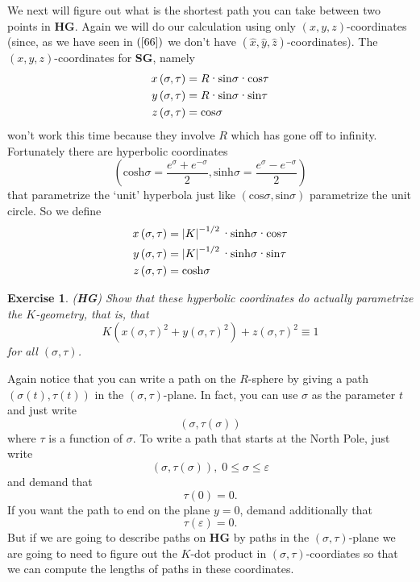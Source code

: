 \documentclass{article}%
\newtheorem{exercise}[theorem]{Exercise}
\begin{document}
We next will figure out what is the shortest path you can take between two
points in \textbf{HG}. Again we will do our calculation using only $\left(
x,y,z\right)  $-coordinates (since, as we have seen in $\left(  \ref{66}%
\right)  $ we don't have $\left(  \hat{x},\hat{y},\hat{z}\right)
$-coordinates). The $\left(  x,y,z\right)  $-coordinates for \textbf{SG},
namely
\begin{align*}
x\left(  \sigma,\tau\right)   &  =R\text{\textperiodcentered}\mathrm{sin}%
\sigma\text{\textperiodcentered}\mathrm{cos}\tau\\
y\left(  \sigma,\tau\right)   &  =R\text{\textperiodcentered}\mathrm{sin}%
\sigma\text{\textperiodcentered}\mathrm{sin}\tau\\
z\left(  \sigma,\tau\right)   &  =\mathrm{cos}\sigma
\end{align*}
won't work this time because they involve $R$ which has gone off to infinity.
Fortunately there are hyperbolic coordinates%
\[
\left(  \mathrm{cosh}\sigma=\frac{e^{\sigma}+e^{-\sigma}}{2},\mathrm{sinh}%
\sigma=\frac{e^{\sigma}-e^{-\sigma}}{2}\right)
\]
that parametrize the `unit' hyperbola just like $\left(  \mathrm{cos}%
\sigma,\mathrm{sin}\sigma\right)  $ parametrize the unit circle. So we define%
\begin{align*}
x\left(  \sigma,\tau\right)   &  =\left\vert K\right\vert ^{-1/2}%
\text{\textperiodcentered}\mathrm{sinh}\sigma\text{\textperiodcentered
}\mathrm{cos}\tau\\
y\left(  \sigma,\tau\right)   &  =\left\vert K\right\vert ^{-1/2}%
\text{\textperiodcentered}\mathrm{sinh}\sigma\text{\textperiodcentered
}\mathrm{sin}\tau\\
z\left(  \sigma,\tau\right)   &  =\mathrm{cosh}\sigma
\end{align*}


\begin{exercise}
(\textbf{HG}) Show that these hyperbolic coordinates do actually parametrize
the $K$-geometry, that is, that%
\[
K\left(  x\left(  \sigma,\tau\right)  ^{2}+y\left(  \sigma,\tau\right)
^{2}\right)  +z\left(  \sigma,\tau\right)  ^{2}\equiv1
\]
for all $\left(  \sigma,\tau\right)  $.
\end{exercise}

Again notice that you can write a path on the $R$-sphere by giving a path
$\left(  \sigma\left(  t\right)  ,\tau\left(  t\right)  \right)  $ in the
$\left(  \sigma,\tau\right)  $-plane. In fact, you can use $\sigma$ as the
parameter $t$ and just write
\[
\left(  \sigma,\tau\left(  \sigma\right)  \right)
\]
where $\tau$ is a function of $\sigma$. To write a path that starts at the
North Pole, just write%
\[
\left(  \sigma,\tau\left(  \sigma\right)  \right)  ,\;0\leq\sigma
\leq\varepsilon
\]
and demand that%
\[
\tau\left(  0\right)  =0.
\]
If you want the path to end on the plane $y=0$, demand additionally that%
\[
\tau\left(  \varepsilon\right)  =0.
\]
But if we are going to describe paths on \textbf{HG} by paths in the $\left(
\sigma,\tau\right)  $-plane we are going to need to figure out the $K$-dot
product in $\left(  \sigma,\tau\right)  $-coordiates so that we can compute
the lengths of paths in these coordinates.
\end{document}
